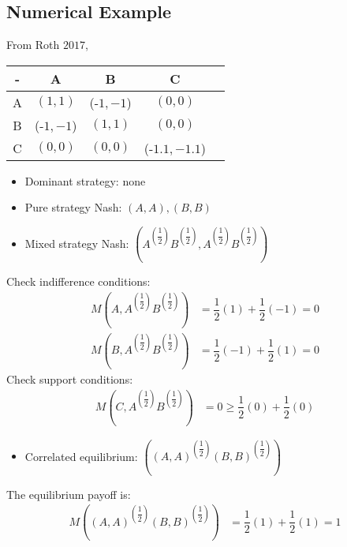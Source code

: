 \documentclass{article}
\begin{document}
\subsection{Numerical Example}
From Roth $2017$,
\begin{center} \begin{tabular}{|c|c|c|c|c|}
\hline
 - &A &B &C\\ \hline
A &$\left(1, 1\right)$ &(-$1, -1$) &$\left(0, 0\right)$\\ \hline
B &(-$1, -1$) &$\left(1, 1\right)$ &$\left(0, 0\right)$\\ \hline
C &$\left(0, 0\right)$ &$\left(0, 0\right)$ &(-$1.1, -1.1$)\\ \hline
\end{tabular} \end{center}
\begin{itemize}
\item Dominant strategy: none
\item Pure strategy Nash: $\left(A , A \right), \left(B , B \right)$
\item Mixed strategy Nash: $\left(A^{\left(\dfrac{1}{2}\right)}B^{\left(\dfrac{1}{2}\right)}, A^{\left(\dfrac{1}{2}\right)}B^{\left(\dfrac{1}{2}\right)}\right)$
\end{itemize}Check indifference conditions:
\begin{align*}
M\left(A, A^{\left(\dfrac{1}{2}\right)}B^{\left(\dfrac{1}{2}\right)}\right)  &= \dfrac{1}{2} \left(1\right) + \dfrac{1}{2} \left(-1\right) = 0
\\ M\left(B, A^{\left(\dfrac{1}{2}\right)}B^{\left(\dfrac{1}{2}\right)}\right)  &= \dfrac{1}{2} \left(-1\right) + \dfrac{1}{2} \left(1\right) = 0
\end{align*}
Check support conditions:
\begin{align*}
M\left(C, A^{\left(\dfrac{1}{2}\right)}B^{\left(\dfrac{1}{2}\right)}\right)  &= 0 \geq  \dfrac{1}{2} \left(0\right) + \dfrac{1}{2} \left(0\right)
\end{align*}
\begin{itemize}
\item Correlated equilibrium: $\left(\left(A,A \right)^{\left(\dfrac{1}{2}\right)}\left(B,B\right)^{\left(\dfrac{1}{2}\right)}\right)$
\end{itemize}The equilibrium payoff is:
\begin{align*}
M\left(\left(A,A\right)^{\left(\dfrac{1}{2}\right)}\left(B,B\right)^{\left(\dfrac{1}{2}\right)}\right)  &= \dfrac{1}{2} \left(1\right) + \dfrac{1}{2} \left(1\right) = 1
\end{align*}
\end{document}
